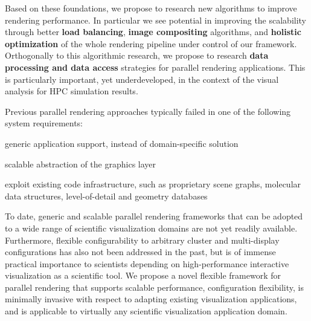  Based on these foundations, we propose to research new algorithms to improve
 rendering performance. In particular we see potential in improving the
 scalability through better {\bf load balancing}, {\bf image compositing}
 algorithms, and {\bf holistic optimization} of the whole rendering pipeline
 under control of our framework. Orthogonally to this algorithmic research, we
 propose to research {\bf data processing and data access} strategies for
 parallel rendering applications. This is particularly important, yet
 underdeveloped, in the context of the visual analysis for HPC simulation
 results.

 Previous parallel rendering approaches typically failed in one of the following
 system requirements:
 \begin{compactenum}
  \item generic application support, instead of domain-specific solution
  \item scalable abstraction of the graphics layer
  \item exploit existing code infrastructure, such as proprietary scene graphs, molecular data structures, level-of-detail and geometry databases
 \end{compactenum}

 To date, generic and scalable parallel rendering frameworks that can be adopted
 to a wide range of scientific visualization domains are not yet readily
 available. Furthermore, flexible configurability to arbitrary cluster and
 multi-display configurations has also not been addressed in the past, but is of
 immense practical importance to scientists depending on high-performance
 interactive visualization as a scientific tool. We propose a novel flexible
 framework for parallel rendering that supports scalable performance,
 configuration flexibility, is minimally invasive with respect to adapting
 existing visualization applications, and is applicable to virtually any
 scientific visualization application domain.

